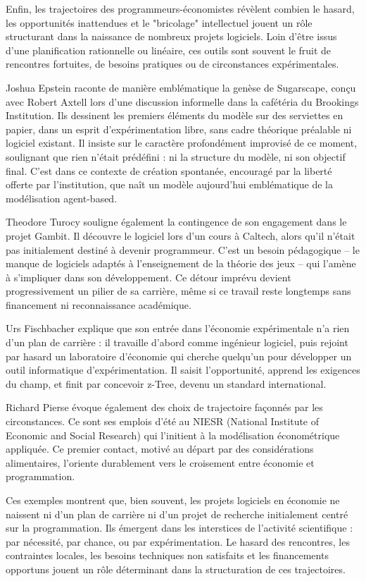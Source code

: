Enfin, les trajectoires des programmeurs-économistes révèlent combien le hasard, les opportunités inattendues et le "bricolage" intellectuel jouent un rôle structurant dans la naissance de nombreux projets logiciels. Loin d’être issus d’une planification rationnelle ou linéaire, ces outils sont souvent le fruit de rencontres fortuites, de besoins pratiques ou de circonstances expérimentales. 

Joshua Epstein raconte de manière emblématique la genèse de Sugarscape, conçu avec Robert Axtell lors d’une discussion informelle dans la cafétéria du Brookings Institution. Ils dessinent les premiers éléments du modèle sur des serviettes en papier, dans un esprit d’expérimentation libre, sans cadre théorique préalable ni logiciel existant. Il insiste sur le caractère profondément improvisé de ce moment, soulignant que rien n’était prédéfini : ni la structure du modèle, ni son objectif final. C’est dans ce contexte de création spontanée, encouragé par la liberté offerte par l’institution, que naît un modèle aujourd’hui emblématique de la modélisation agent-based. 

Theodore Turocy souligne également la contingence de son engagement dans le projet Gambit. Il découvre le logiciel lors d’un cours à Caltech, alors qu’il n’était pas initialement destiné à devenir programmeur. C’est un besoin pédagogique – le manque de logiciels adaptés à l’enseignement de la théorie des jeux – qui l’amène à s’impliquer dans son développement. Ce détour imprévu devient progressivement un pilier de sa carrière, même si ce travail reste longtemps sans financement ni reconnaissance académique. 

Urs Fischbacher explique que son entrée dans l’économie expérimentale n’a rien d’un plan de carrière : il travaille d’abord comme ingénieur logiciel, puis rejoint par hasard un laboratoire d’économie qui cherche quelqu’un pour développer un outil informatique d’expérimentation. Il saisit l’opportunité, apprend les exigences du champ, et finit par concevoir z-Tree, devenu un standard international. 

Richard Pierse évoque également des choix de trajectoire façonnés par les circonstances. Ce sont ses emplois d’été au NIESR (National Institute of Economic and Social Research) qui l’initient à la modélisation économétrique appliquée. Ce premier contact, motivé au départ par des considérations alimentaires, l’oriente durablement vers le croisement entre économie et programmation. 

Ces exemples montrent que, bien souvent, les projets logiciels en économie ne naissent ni d’un plan de carrière ni d’un projet de recherche initialement centré sur la programmation. Ils émergent dans les interstices de l’activité scientifique : par nécessité, par chance, ou par expérimentation. Le hasard des rencontres, les contraintes locales, les besoins techniques non satisfaits et les financements opportuns jouent un rôle déterminant dans la structuration de ces trajectoires.\\[2cm]






